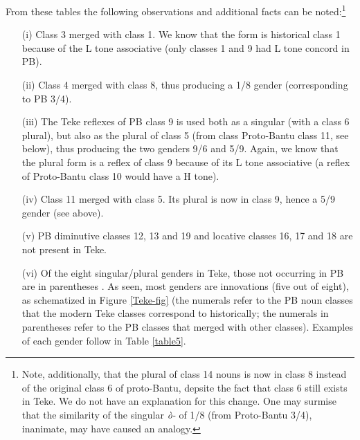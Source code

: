 \documentclass[output=paper,,modfonts,nonflat]{langsci/langscibook-Hyman-et-al}
\begin{document}
From these tables the following observations and additional facts can be noted:\footnote{Note, additionally, that the plural of class 14 nouns is now in class 8 instead of the original class 6 of proto-Bantu, depsite the fact that class 6 still exists in Teke. We do not have an explanation for this change. One may surmise that the similarity of the singular \emph{ò-} of 1/8 (from Proto-Bantu 3/4), inanimate, may have caused an analogy.}
\begin{enumerate}[noitemsep]
\item[(i)] Class 3 merged with class 1. We know that the form is historical class 1 because of the L tone associative (only classes 1 and 9 had L tone concord in PB).
\item[(ii)] Class 4 merged with class 8, thus producing a 1/8 gender (corresponding to PB 3/4).
\item[(iii)]  The Teke reflexes of PB class 9 is used both as a singular (with a class 6 plural), but also as the plural of class 5 (from class Proto-Bantu class 11, see below), thus producing the two genders 9/6 and 5/9. Again, we know that the plural form is a reflex of class 9 because of its L tone associative (a reflex of Proto-Bantu class 10 would have a H tone).
\item[(iv)]  Class 11 merged with class 5. Its plural is now in class 9, hence a 5/9 gender (see above).
\item[(v)]  PB diminutive classes 12, 13 and 19 and locative classes 16, 17 and 18 are not present in Teke.
\item[(vi)]  Of the eight singular/plural genders in Teke, those not occurring in PB are in parentheses . As seen, most genders are innovations (five out of eight), as schematized in Figure \ref{Teke-fig} (the numerals refer to the PB noun classes that the modern Teke classes correspond to historically; the numerals in parentheses refer to the PB classes that merged with other classes). Examples of each gender follow in Table \ref{table5}. 
\end{enumerate} 
\end{document}
